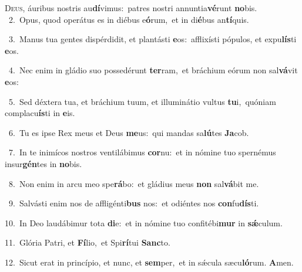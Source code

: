 \lettrine{\initial\textcolor{\initialcolor}{D}}{eus,} áuribus nostris au\-\textbf{dí}\-vimus:~\star patres nostri annuntia\-\textbf{vé}\-runt \textbf{no}\-bis.\\
{\numbfont\textcolor{\numbcolor}{~2.}}~Opus, quod operátus es in diébus e\-\textbf{ó}\-rum,~\star et in di\-\textbf{é}\-bus an\-\textbf{tí}\-quis.\par
{\numbfont\textcolor{\numbcolor}{~3.}}~Manus tua gentes dispérdidit, et plantásti \textbf{e}\-os:~\star afflixísti pópulos, et expu\-\textbf{lís}\-ti \textbf{e}\-os.\par
{\numbfont\textcolor{\numbcolor}{~4.}}~Nec enim in gládio suo possedérunt \textbf{ter}\-ram,~\star et bráchium eórum non sal\-\textbf{vá}\-vit \textbf{e}\-os:\par
{\numbfont\textcolor{\numbcolor}{~5.}}~Sed déxtera tua, et bráchium tuum, et illuminátio vultus \textbf{tu}\-i,~\star quóniam complacu\-\textbf{ís}\-ti in \textbf{e}\-is.\par
{\numbfont\textcolor{\numbcolor}{~6.}}~Tu es ipse Rex meus et Deus \textbf{me}\-us:~\star qui mandas sa\-\textbf{lú}\-tes \textbf{Ja}\-cob.\par
{\numbfont\textcolor{\numbcolor}{~7.}}~In te inimícos nostros ventilábimus \textbf{cor}\-nu:~\star et in nómine tuo spernémus insur\-\textbf{gén}\-tes in \textbf{no}\-bis.\par
{\numbfont\textcolor{\numbcolor}{~8.}}~Non enim in arcu meo spe\-\textbf{rá}\-bo:~\star et gládius meus \textbf{non} sal\-\textbf{vá}\-bit me.\par
{\numbfont\textcolor{\numbcolor}{~9.}}~Salvásti enim nos de affligénti\textbf{bus} nos:~\star et odiéntes nos \textbf{con}\-fu\-\textbf{dís}\-ti.\par
{\numbfont\textcolor{\numbcolor}{10.}}~In Deo laudábimur tota \textbf{di}\-e:~\star et in nómine tuo confitébi\textbf{mur} in \textbf{sǽ}\-culum.\par
{\numbfont\textcolor{\numbcolor}{11.}}~Glória Patri, et \textbf{Fí}\-lio,~\star et Spi\-\textbf{rí}\-tui \textbf{Sanc}\-to.\par
{\numbfont\textcolor{\numbcolor}{12.}}~Sicut erat in princípio, et nunc, et \textbf{sem}\-per,~\star et in sǽcula sæcu\-\textbf{ló}\-rum. \textbf{A}\-men.\par
